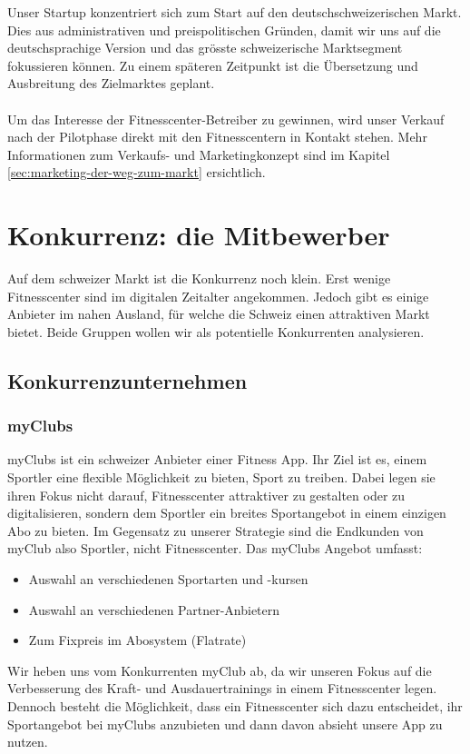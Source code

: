 Unser Startup konzentriert sich zum Start auf den deutschschweizerischen Markt. Dies aus administrativen und preispolitischen Gründen, damit wir uns auf die deutschsprachige Version und das grösste schweizerische Marktsegment fokussieren können. Zu einem späteren Zeitpunkt ist die Übersetzung und Ausbreitung des Zielmarktes geplant.
\\ \\
Um das Interesse der Fitnesscenter-Betreiber zu gewinnen, wird unser Verkauf nach der Pilotphase direkt mit den Fitnesscentern in Kontakt stehen. Mehr Informationen zum Verkaufs- und Marketingkonzept sind im Kapitel \ref{sec:marketing-der-weg-zum-markt} ersichtlich.


\clearpage
\section{Konkurrenz: die Mitbewerber}\label{sec:konkurrenz-die-mitbewerber}

Auf dem schweizer Markt ist die Konkurrenz noch klein. Erst wenige Fitnesscenter sind im digitalen Zeitalter angekommen. Jedoch gibt es einige Anbieter im nahen Ausland, für welche die Schweiz einen attraktiven Markt bietet. Beide Gruppen wollen wir als potentielle Konkurrenten analysieren.
\subsection{Konkurrenzunternehmen}
\subsubsection{myClubs}
myClubs\cite{myclubs} ist ein schweizer Anbieter einer Fitness App. Ihr Ziel ist es, einem Sportler eine flexible Möglichkeit zu bieten, Sport zu treiben. Dabei legen sie ihren Fokus nicht darauf, Fitnesscenter attraktiver zu gestalten oder zu digitalisieren, sondern dem Sportler ein breites Sportangebot in einem einzigen Abo zu bieten. Im Gegensatz zu unserer Strategie sind die Endkunden von myClub also Sportler, nicht Fitnesscenter.
Das myClubs Angebot umfasst:
\begin{itemize}
	\item Auswahl an verschiedenen Sportarten und -kursen
	\item Auswahl an verschiedenen Partner-Anbietern
	\item Zum Fixpreis im Abosystem (Flatrate)
\end{itemize}
Wir heben uns vom Konkurrenten myClub ab, da wir unseren Fokus auf die Verbesserung des Kraft- und Ausdauertrainings in einem Fitnesscenter legen. Dennoch besteht die Möglichkeit, dass ein Fitnesscenter sich dazu entscheidet, ihr Sportangebot bei myClubs anzubieten und dann davon absieht unsere App zu nutzen.

